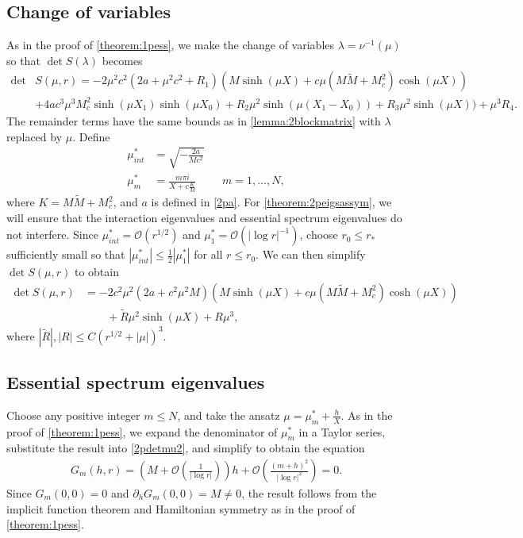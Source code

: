 \documentclass[12pt]{elsarticle}
\theoremstyle{plain}
\theoremstyle{definition}
\theoremstyle{remark}
\numberwithin{theorem}{section}
\numberwithin{equation}{section}
\begin{document}
\subsection{Change of variables}

As in the proof of \cref{theorem:1pess}, we make the change of variables $\lambda = \nu^{-1}(\mu)$ so that $\det S(\lambda)$ becomes 
\begin{equation}\label{2pdetmu}
\begin{aligned}
\det &S(\mu, r) = -2 \mu^2 c^2 (2a + \mu^2 c^2 + R_1) \left( M \sinh(\mu X) + c \mu (M \tilde{M} + M_c^2 ) \cosh(\mu X) \right) \\
&+4 a c^3 \mu^3 M_c^2 \sinh(\mu X_1)\sinh(\mu X_0) 
+ R_2 \mu^2 \sinh(\mu(X_1 - X_0)) + R_3 \mu^2 \sinh(\mu X)) + \mu^3 R_4.
\end{aligned}
\end{equation}
The remainder terms have the same bounds as in \cref{lemma:2blockmatrix} with $\lambda$ replaced by $\mu$. Define
\begin{align}
\mu^*_{int} &= \sqrt{-\frac{2 a}{M c^2}} \label{defmustarint} \\
\mu^*_m &= \frac{m \pi i}{X + c \frac{K}{M}}  && m = 1, \dots, N, \label{defmustaress}
\end{align}
where $K = M \tilde{M} + M_c^2$, and $a$ is defined in \cref{2pa}. For \cref{theorem:2peigsassym}, we will ensure that the interaction eigenvalues and essential spectrum eigenvalues do not interfere. Since $\mu^*_{int} = \mathcal{O}(r^{1/2})$ and $\mu^*_1 = \mathcal{O}(|\log r|^{-1})$, choose $r_0 \leq r_*$ sufficiently small so that $|\mu^*_{int}| \leq \frac{1}{2} |\mu^*_1|$ for all $r \leq r_0$. We can then simplify $\det S(\mu, r)$ to obtain 
\begin{equation}\label{2pdetmu2}
\begin{aligned}
\det S(\mu, r) &= -2 c^2 \mu^2 (2a + c^2 \mu^2 M) \left( M \sinh(\mu X) + c \mu (M \tilde{M} + M_c^2 ) \cosh(\mu X) \right) \\
&\qquad + \tilde{R} \mu^2 \sinh(\mu X) + R \mu^3,
\end{aligned}
\end{equation}
where $|\tilde{R}|, |R| \leq C(r^{1/2} + |\mu|)^3$. 

\subsection{Essential spectrum eigenvalues}

Choose any positive integer $m \leq N$, and take the ansatz $\mu = \mu^*_m + \frac{h}{X}$. As in the proof of \cref{theorem:1pess}, we expand the denominator of $\mu^*_m$ in a Taylor series, substitute the result into \cref{2pdetmu2}, and simplify to obtain the equation
\begin{align*}
G_m(h, r) = \left( M + \mathcal{O}\left( \frac{1}{|\log r|} \right)\right) h + \mathcal{O}\left( \frac{(m+h)^2}{|\log r|^2} \right) = 0.
\end{align*}
Since $G_m(0,0) = 0$ and $\partial_h G_m(0,0) = M \neq 0$, the result follows from the implicit function theorem and Hamiltonian symmetry as in the proof of \cref{theorem:1pess}.
\end{document}
